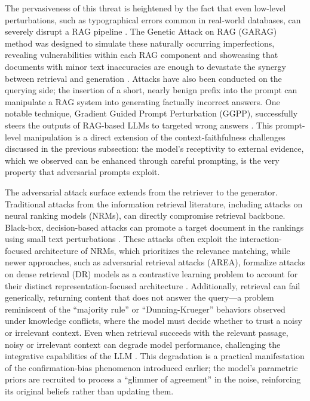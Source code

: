\documentclass[11pt]{article}
\begin{document}
The pervasiveness of this threat is heightened by the fact that even low-level perturbations, such as typographical errors common in real-world databases, can severely disrupt a RAG pipeline \cite{ref258}. The Genetic Attack on RAG (GARAG) method was designed to simulate these naturally occurring imperfections, revealing vulnerabilities within each RAG component and showcasing that documents with minor text inaccuracies are enough to devastate the synergy between retrieval and generation \cite{ref258}. Attacks have also been conducted on the querying side; the insertion of a short, nearly benign prefix into the prompt can manipulate a RAG system into generating factually incorrect answers. One notable technique, Gradient Guided Prompt Perturbation (GGPP), successfully steers the outputs of RAG-based LLMs to targeted wrong answers \cite{ref259}. This prompt-level manipulation is a direct extension of the context-faithfulness challenges discussed in the previous subsection: the model's receptivity to external evidence, which we observed can be enhanced through careful prompting, is the very property that adversarial prompts exploit.

The adversarial attack surface extends from the retriever to the generator. Traditional attacks from the information retrieval literature, including attacks on neural ranking models (NRMs), can directly compromise retrieval backbone. Black-box, decision-based attacks can promote a target document in the rankings using small text perturbations \cite{ref260}. These attacks often exploit the interaction-focused architecture of NRMs, which prioritizes the relevance matching, while newer approaches, such as adversarial retrieval attacks (AREA), formalize attacks on dense retrieval (DR) models as a contrastive learning problem to account for their distinct representation-focused architecture \cite{ref261}. Additionally, retrieval can fail generically, returning content that does not answer the query---a problem reminiscent of the ``majority rule'' or ``Dunning-Krueger'' behaviors observed under knowledge conflicts, where the model must decide whether to trust a noisy or irrelevant context. Even when retrieval succeeds with the relevant passage, noisy or irrelevant context can degrade model performance, challenging the integrative capabilities of the LLM \cite{ref34}. This degradation is a practical manifestation of the confirmation-bias phenomenon introduced earlier; the model's parametric priors are recruited to process a ``glimmer of agreement'' in the noise, reinforcing its original beliefs rather than updating them.
\end{document}
